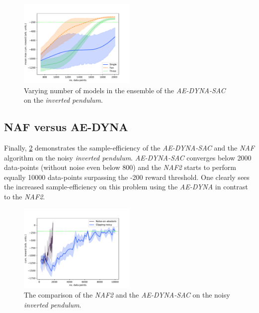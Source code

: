 \documentclass[
reprint,
amsmath,amssymb,amsfonts,clevref,
aps,
prstab,
]{revtex4-2}
\begin{document}
\begin{figure}[!h]
	\centering
	\includegraphics*[width=0.5\textwidth]{Figures/Comparison_models_sizes}
	\caption{Varying number of models in the ensemble of the \emph{AE-DYNA-SAC} on the \emph{inverted pendulum}.}
	\label{fig:Compare_models_sizes}
\end{figure}
\subsection{NAF versus AE-DYNA}
	Finally, \cref{fig:comparsion_NAF_AE-DYNA} demonstrates the sample-efficiency of the \emph{AE-DYNA-SAC} and the \emph{NAF} algorithm on the noisy \emph{inverted pendulum}. \emph{AE-DYNA-SAC} converges below 2000 data-points (without noise even below 800) and the \emph{NAF2} starts to perform equally 10000 data-points surpassing the -200 reward threshold. One clearly sees the increased sample-efficiency on this problem using the \emph{AE-DYNA} in contrast to the \emph{NAF2}.
		\begin{figure}[!h]
		\centering
		\includegraphics*[width=0.5\textwidth]{Figures/Comparison_NAF_AE-DYNA}
		\caption{The comparison of the \emph{NAF2} and the \emph{AE-DYNA-SAC} on the noisy \emph{inverted pendulum}.}
		\label{fig:comparsion_NAF_AE-DYNA}
	\end{figure}
\end{document}
